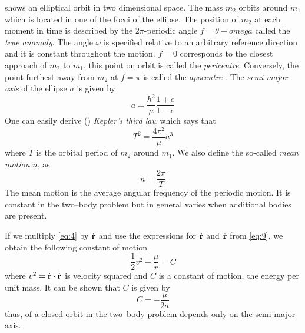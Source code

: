  shows an elliptical orbit in two dimensional space. The mass
$m_2$ orbits around $m_1$ which is located in one of the focci of the ellipse.
The position of $m_2$ at each moment in time is described by the $2\pi$-periodic
angle 
$f=\theta - omega$ called the \emph{true anomaly}. The angle $\omega$ is specified 
relative to an arbitrary reference direction and it is constant throughout the 
motion. $f=0$ corresponds to the closest approach of $m_2$ to $m_1$, this point on
orbit is called the \emph{pericentre}. Conversely, the point furthest away from 
$m_2$ at $f=\pi$ is called the \emph{apocentre} . 
The \emph{semi-major axis} of the ellipse $a$ is given by
\begin{equation}
    a= \frac{h^2}{\mu} \frac{1+e}{1-e} 
\end{equation}
One can easily derive (\cite[ex.]{murray}) \emph{Kepler's third law} which says 
that
\begin{equation}
    T^2= \frac{4\pi^2}{\mu} a^3
    \label{eq:kepler_law}
\end{equation}
where $T$ is the orbital period of $m_2$ around $m_1$. We also define the so-called
\emph{mean motion} $n$, as
\begin{equation}
    n= \frac{2\pi}{T} 
\end{equation}
The mean motion is the average angular frequency of the periodic motion. It is 
constant in the two--body problem but in general varies when additional bodies are 
present.

If we multiply \cref{eq:4} by $\dot{\boldsymbol{\mathbf{r}}}$ and use the expressions for
$\dot{\boldsymbol{\mathbf{r}}}$ and $\ddot{\boldsymbol{\mathbf{r}}}$ from \cref{eq:9}, we obtain the following
constant of motion
\begin{equation}
    \frac{1}{2} v^2 - \frac{\mu}{r} =C
\end{equation}
where $v^2=\dot{\boldsymbol{\mathbf{r}}}\cdot\dot{\boldsymbol{\mathbf{r}}}$ is velocity squared and $C$ is a
constant of motion, the energy per unit mass. It can be shown \citep{murray}
that $C$ is given by
\begin{equation}
    C= -\frac{\mu}{2a} 
\end{equation}
thus, of a closed orbit in the two--body problem depends only on the semi-major axis.
